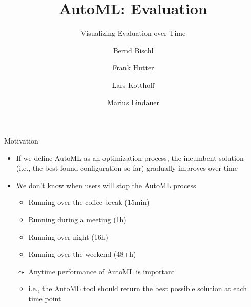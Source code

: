 




\title[AutoML: Risks]{AutoML: Evaluation} %
\subtitle{Visualizing Evaluation over Time} %
\author[Marius Lindauer]{Bernd Bischl \and Frank Hutter \and Lars Kotthoff\newline \and \underline{Marius Lindauer}}
\institute{}
\date{}

\newcommand\reffootnote[1]{%
	\begingroup
	\renewcommand\thefootnote{}\footnote{
		\tiny #1
		\vspace*{1em}}%
	\addtocounter{footnote}{-1}%
	\endgroup
}



	
\maketitle

\begin{frame}[c]{Motivation}
	\begin{itemize}
		\item If we define AutoML as an optimization process, the incumbent solution\\ (i.e., the best found configuration so far) gradually improves over time
		\medskip
		\pause
		\item We don't know when users will stop the AutoML process
		\begin{itemize}
			\item Running over the coffee break (15min)
			\item Running during a meeting (1h)
			\item Running over night (16h)
			\item Running over the weekend (48+h)
		\end{itemize}
		\pause
		\medskip
		\item[$\leadsto$] Anytime performance of AutoML is important
		\begin{itemize}
			\item i.e., the AutoML tool should return the best possible solution at each time point
		\end{itemize}
	\end{itemize}
\end{frame}

